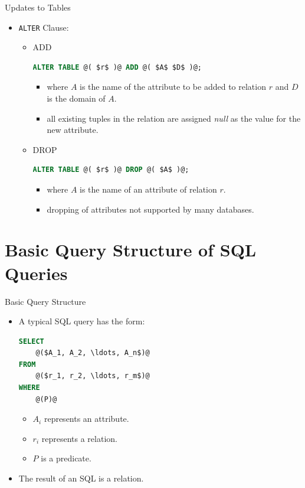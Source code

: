 \documentclass[aspectratio=169]{beamer}
\begin{document}
\begin{frame}[fragile]{Updates to Tables}
    \begin{itemize}
        \item \texttt{ALTER} Clause:
        \begin{itemize}
            \item ADD
                \begin{lstlisting}[language=SQL]
ALTER TABLE @( $r$ )@ ADD @( $A$ $D$ )@;
                \end{lstlisting}
                \begin{itemize}
                    \item where $A$ is the name of the attribute to be added to relation $r$ and $D$ is the domain of $A$.
                    \item all existing tuples in the relation are assigned \textit{null} as the value for the new attribute.
                \end{itemize}
            \item DROP
                \begin{lstlisting}[language=SQL]
ALTER TABLE @( $r$ )@ DROP @( $A$ )@;
                \end{lstlisting}
                \begin{itemize}
                    \item where $A$ is the name of an attribute of relation $r$.
                    \item dropping of attributes not supported by many databases.
                \end{itemize}
        \end{itemize}
    \end{itemize}
\end{frame}

\section{Basic Query Structure of SQL Queries}

\begin{frame}[fragile]{Basic Query Structure}
    \begin{itemize}
        \item A typical SQL query has the form:
        \begin{lstlisting}[language=SQL]
SELECT
    @($A_1, A_2, \ldots, A_n$)@
FROM
    @($r_1, r_2, \ldots, r_m$)@
WHERE
    @(P)@
        \end{lstlisting}
        \begin{itemize}
            \item $A_i$ represents an attribute.
            \item $r_i$ represents a relation.
            \item $P$ is a predicate.
        \end{itemize}
        \item The result of an SQL is a relation.
    \end{itemize}
\end{frame}
\end{document}
